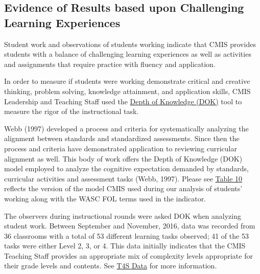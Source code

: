 \documentclass{report}
\begin{document}
\subsection{Evidence of Results based upon Challenging Learning Experiences }



\begin{findings}
Student work and observations of students working indicate that CMIS provides students with a balance of challenging learning experiences as well as activities and assignments that require practice with fluency and application.  


In order to measure if students were working demonstrate critical and creative thinking, problem solving, knowledge attainment, and application skills, CMIS Leadership and Teaching Staff used the  \href{https://drive.google.com/a/cmis.ac.th/file/d/0ByVFfrm0zfolNVJmeEJwcHUxbjg/view?usp=sharing}{Depth of Knowledge (DOK)} tool to measure the rigor of the  instructional task. 

Webb (1997) developed a process and criteria for systematically analyzing the alignment between standards and standardized assessments. Since then the process and criteria have demonstrated application to reviewing curricular alignment as well. This body of work offers the Depth of Knowledge (DOK) model employed to analyze the cognitive expectation demanded by standards, curricular activities and assessment tasks (Webb, 1997). Please see \href{https://docs.google.com/a/cmis.ac.th/document/d/1cZlDn-POZCJs2XZ1SLF-CL_DtiO4GscppQ71QZJtFGg/edit?usp=sharing}{Table 10} reflects the version of the model CMIS used during our analysis of  students’ working along with the WASC FOL terms used in the indicator. 

The observers during instructional rounds were asked DOK when analyzing student work. Between September and November, 2016, data was recorded from 36 classrooms with a total of 53 different learning tasks observed; 41 of the 53 tasks were either Level 2, 3, or 4. This data initially indicates that the CMIS Teaching Staff provides an appropriate mix of complexity levels appropriate for their grade levels and contents. See \href{https://docs.google.com/a/cmis.ac.th/document/d/1cRvL50iIDvo8s1Gnxoczm82LhSVmEOvCrFksxzHD7ko/edit?usp=sharing}{T4S Data} for more information. 


\end{findings}
\end{document}
